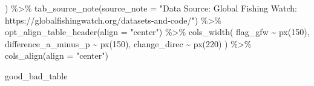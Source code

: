 \documentclass[
]{article}
\newenvironment{Shaded}{\begin{snugshade}}{\end{snugshade}}
\newcommand{\AttributeTok}[1]{\textcolor[rgb]{0.77,0.63,0.00}{#1}}
\newcommand{\DecValTok}[1]{\textcolor[rgb]{0.00,0.00,0.81}{#1}}
\newcommand{\FunctionTok}[1]{\textcolor[rgb]{0.00,0.00,0.00}{#1}}
\newcommand{\NormalTok}[1]{#1}
\newcommand{\SpecialCharTok}[1]{\textcolor[rgb]{0.00,0.00,0.00}{#1}}
\newcommand{\StringTok}[1]{\textcolor[rgb]{0.31,0.60,0.02}{#1}}
\begin{document}
\begin{Shaded}
\begin{Highlighting}[]
\NormalTok{  ) }\SpecialCharTok{\%\textgreater{}\%} 
  \FunctionTok{tab\_source\_note}\NormalTok{(}\AttributeTok{source\_note =} \StringTok{"Data Source: Global Fishing Watch: https://globalfishingwatch.org/datasets{-}and{-}code/"}\NormalTok{) }\SpecialCharTok{\%\textgreater{}\%}
  \FunctionTok{opt\_align\_table\_header}\NormalTok{(}\AttributeTok{align =} \StringTok{"center"}\NormalTok{) }\SpecialCharTok{\%\textgreater{}\%} 
  \FunctionTok{cols\_width}\NormalTok{(}
\NormalTok{    flag\_gfw }\SpecialCharTok{\textasciitilde{}} \FunctionTok{px}\NormalTok{(}\DecValTok{150}\NormalTok{),}
\NormalTok{    difference\_a\_minus\_p }\SpecialCharTok{\textasciitilde{}} \FunctionTok{px}\NormalTok{(}\DecValTok{150}\NormalTok{),}
\NormalTok{    change\_direc }\SpecialCharTok{\textasciitilde{}} \FunctionTok{px}\NormalTok{(}\DecValTok{220}\NormalTok{)}
\NormalTok{  ) }\SpecialCharTok{\%\textgreater{}\%} 
  \FunctionTok{cols\_align}\NormalTok{(}\AttributeTok{align =} \StringTok{"center"}\NormalTok{)}

\NormalTok{good\_bad\_table}
\end{Highlighting}
\end{Shaded}
\end{document}
